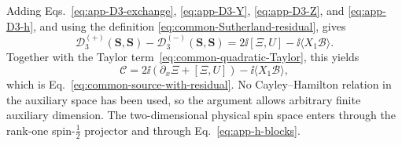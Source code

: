 Adding Eqs.~\eqref{eq:app-D3-exchange}, \eqref{eq:app-D3-Y},
\eqref{eq:app-D3-Z}, and \eqref{eq:app-D3-h}, and using the definition
\eqref{eq:common-Sutherland-residual}, gives
\begin{equation}
\mathcal D^{(+)}_3(\boldsymbol S,\boldsymbol S)
-\mathcal D^{(-)}_3(\boldsymbol S,\boldsymbol S)
=2\ii[\Xi,U]-\ii\langle X_1\mathcal B\rangle.
\label{eq:app-D3-final}
\end{equation}
Together with the Taylor term~\eqref{eq:common-quadratic-Taylor}, this yields
\begin{equation}
\mathcal C
=2\ii\left(\partial_x\Xi+[\Xi,U]\right)
-\ii\langle X_1\mathcal B\rangle,
\label{eq:app-source-final}
\end{equation}
which is Eq.~\eqref{eq:common-source-with-residual}.  No
Cayley--Hamilton relation in the auxiliary space has been used, so the
argument allows arbitrary finite auxiliary dimension.  The two-dimensional
physical spin space enters through the rank-one spin-$\tfrac12$ projector and
through Eq.~\eqref{eq:app-h-blocks}.
